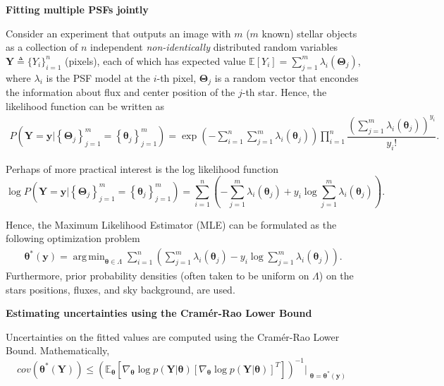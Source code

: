 \documentclass[landscape,a0b,final]{a0poster}
\DeclareMathOperator*{\argmin}{arg\,min}
\newenvironment{poster}{
  \begin{center}
  \begin{minipage}[c]{0.98\textwidth}
}{
  \end{minipage}
  \end{center}
}
\newenvironment{pcolumn}[1]{
  \begin{minipage}{#1\textwidth}
  \begin{center}
}{
  \end{center}
  \end{minipage}
}
\begin{document}
\begin{poster}
\begin{center}
\begin{pcolumn}{0.32}
{    \begin{center}
        \textbf{Fitting multiple PSFs jointly}
    \end{center}

    Consider an experiment that outputs an image with $m$ ($m$ known) stellar objects as a collection of $n$ independent \emph{non-identically} distributed random variables $\bm{Y} \triangleq \{Y_i\}_{i=1}^{n}$ (pixels), each of which has expected value $\mathbb{E}\left[Y_i\right] = \sum_{j=1}^{m}\lambda_i(\bm{\Theta}_j)$, where $\lambda_i$ is the PSF model at the $i$-th pixel, $\bm{\Theta}_j$ is a random vector
    that encondes the information about flux and center position of the $j$-th star. Hence, the likelihood function can be
    written as
\begin{align}
   P\left(\bm{Y} = \bm{y} \Bigr| \left\{\bm{\Theta}_j\right\}_{j=1}^{m} = \left\{\bm{\theta}_j\right\}_{j=1}^{m}\right) = \exp\left({-\sum_{i=1}^{n}\sum_{j=1}^{m}\lambda_i(\bm{\theta}_j)}\right)\prod_{i=1}^{n}\dfrac{\left(\sum_{j=1}^{m}\lambda_i\left(\bm{\theta}_j\right)\right)^{y_i}}{y_i!}.
\end{align}

Perhaps of more practical interest is the log likelihood function
\begin{equation}
    \log  P\left(\bm{Y} = \bm{y} \Bigr| \left\{\bm{\Theta}_j\right\}_{j=1}^{m} = \left\{\bm{\theta}_j\right\}_{j=1}^{m}\right) = \sum_{i=1}^{n}\left(- \sum_{j=1}^{m}\lambda_i(\bm{\theta}_j) + y_i\log\sum_{j=1}^{m}\lambda_i(\bm{\theta}_j)\right).
\end{equation}

    Hence, the Maximum Likelihood Estimator (MLE) can be formulated as the following optimization problem
\begin{align}
    \bm{\theta}^{*}(\bm{y}) = \argmin_{\bm{\theta} \in \Lambda} \sum_{i=1}^{n}\left(\sum_{j=1}^{m}\lambda_i(\bm{\theta}_j) - y_i\log\sum_{j=1}^{m}\lambda_i(\bm{\theta}_j)\right).
\end{align}
Furthermore, prior probability densities (often taken to be uniform on $\Lambda$) on the stars positions, fluxes, and
sky background, are used.

\vspace{0.75cm}
    \begin{center}
        \textbf{Estimating uncertainties using the Cram\'er-Rao Lower Bound}
    \end{center}

Uncertainties on the fitted values are computed using the Cram\'er-Rao Lower Bound. Mathematically,
        \begin{equation}
            cov(\bm{\theta}^{*}(\bm{Y})) \leq \left(\mathbb{E}_{\bm{\theta}}\left[\nabla_{\bm{\theta}}\log p(\bm{Y} | \bm{\theta})\left[\nabla_{\bm{\theta}}\log p(\bm{Y} | \bm{\theta}) \right]^{T}  \right]\right)^{-1}\Bigr|_{\substack{\bm{\theta}=\bm{\theta}^{*}(\bm{y})}}
        \end{equation}

}
\end{pcolumn}
\end{center}
\end{poster}
\end{document}
